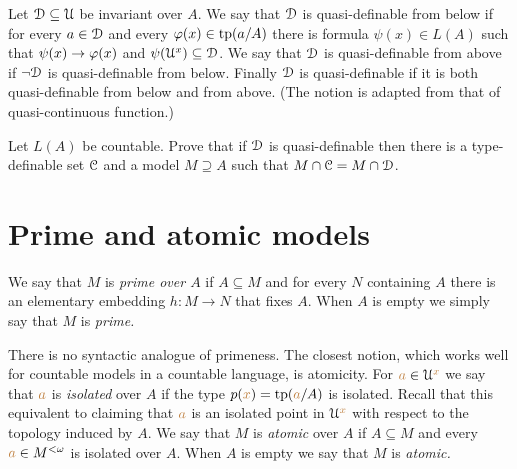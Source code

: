 \begin{exercise}
   Let $\EuScript D\subseteq\EuScript U$ be invariant over $A$.
   We say that $\EuScript D$ is quasi-definable from below if for every $a\in\EuScript D$ and every $\varphi(x)\in{\rm tp}(a/A)$ there is formula $\psi(x)\in L(A)$ such that $\psi(x)\rightarrow\varphi(x)$ and $\psi(\EuScript U^x)\subseteq\EuScript D$.
   We say that $\EuScript D$ is quasi-definable from above if $\neg\EuScript D$ is quasi-definable from below.
   Finally $\EuScript D$ is quasi-definable if it is both quasi-definable from below and from above. (The notion is adapted from that of quasi-continuous function.)

   Let $L(A)$ be countable. 
   Prove that if $\EuScript D$ is quasi-definable then there is a type-definable set $\EuScript C$ and a model $M\supseteq A$ such that $M\cap\EuScript C=M\cap\EuScript D$.
\end{exercise}
\section{Prime and atomic models}

We say that $M$ is \emph{prime over $A$\/} if $A\subseteq M$ and for every $N$ containing $A$ there is an elementary embedding $h:M\to N$ that fixes $A$.
When $A$ is empty we simply say that $M$ is \emph{prime.}

There is no syntactic analogue of primeness.
The closest notion, which works well for countable models in a countable language, is atomicity.
For ${\color{brown} a}\in\EuScript U^{\color{brown} x}$ we say that ${\color{brown} a}$ is  \emph{isolated\/} over $A$ if the type $p({\color{brown} x})={\rm tp}({\color{brown} a}/A)$ is isolated.
Recall that this equivalent to claiming that ${\color{brown} a}$ is an isolated point in $\EuScript U^{\color{brown} x}$ with respect to the topology induced by $A$.
We say that $M$ is \emph{atomic\/} over $A$ if $A\subseteq M$ and every ${\color{brown} a}\in M^{<\omega}$ is isolated over $A$.
When $A$ is empty we say that $M$ is \emph{atomic.}


